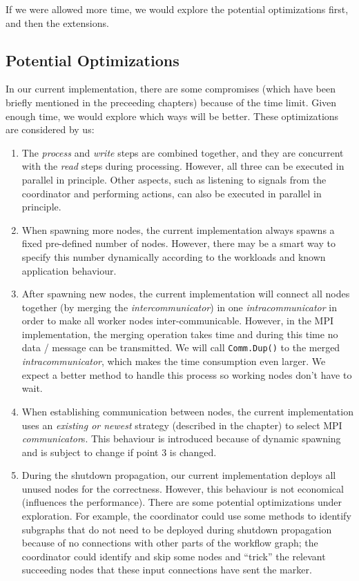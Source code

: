 If we were allowed more time, we would explore the potential optimizations first, and then the extensions.

\subsection{Potential Optimizations}
In our current implementation, there are some compromises (which have been briefly mentioned in the preceeding chapters) because of the time limit. Given enough time, we would explore which ways will be better. These optimizations are considered by us:

\begin{enumerate}
	\item The \emph{process} and \emph{write} steps are combined together, and they are concurrent with the \emph{read} steps during processing. However, all three can be executed in parallel in principle. Other aspects, such as listening to signals from the coordinator and performing actions, can also be executed in parallel in principle.
	\item When spawning more nodes, the current implementation always spawns a fixed pre-defined number of nodes. However, there may be a smart way to specify this number dynamically according to the workloads and known application behaviour.
	\item After spawning new nodes, the current implementation will connect all nodes together (by merging the \emph{intercommunicator}) in one \emph{intracommunicator} in order to make all worker nodes inter-communicable. However, in the MPI implementation, the merging operation takes time and during this time no data / message can be transmitted. We will call \lstinline|Comm.Dup()| to the merged \emph{intracommunicator}, which makes the time consumption even larger. We expect a better method to handle this process so working nodes don't have to wait.
	\item When establishing communication between nodes, the current implementation uses an \emph{existing or newest} strategy (described in the \tIncDep chapter) to select MPI \emph{communicator}s. This behaviour is introduced because of dynamic spawning and is subject to change if point 3 is changed.
	\item During the shutdown propagation, our current implementation deploys all unused nodes for the correctness. However, this behaviour is not economical (\ie influences the performance). There are some potential optimizations under exploration. For example, the coordinator could use some methods to identify subgraphs that do not need to be deployed during shutdown propagation because of no connections with other parts of the workflow graph; the coordinator could identify and skip some nodes and ``trick'' the relevant succeeding nodes that these input connections have sent the \dEOS marker.
\end{enumerate}

